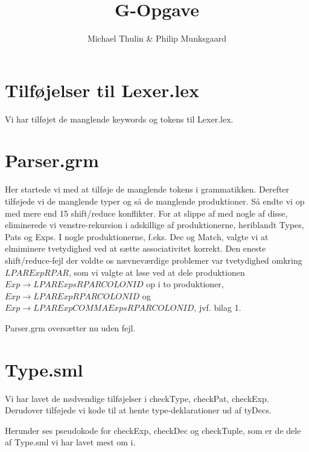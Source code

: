 \documentclass [10pt,a4paper]{article}
\title{G-Opgave}
\author{Michael Thulin \& Philip Munksgaard}
\begin{document}
\maketitle

\section{Tilføjelser til Lexer.lex}

Vi har tilføjet de manglende keywords og tokens til Lexer.lex. 

\section{Parser.grm}

Her startede vi med at tilføje de manglende tokens i
grammatikken. Derefter tilføjede vi de manglende typer og så de
manglende produktioner. Så endte vi op med mere end 15 shift/reduce
konflikter. For at slippe af med nogle af disse, eliminerede vi
venstre-rekursion i adskillige af produktionerne, heriblandt Types,
Pats og Exps. I nogle produktionerne, f.eks. Dec og Match, valgte vi
at elmiminere tvetydighed ved at sætte associativitet korrekt.
Den eneste shift/reduce-fejl der voldte os nævneværdige problemer var
tvetydighed omkring $LPAR Exp RPAR$, som vi valgte at løse ved at
dele produktionen $Exp \to LPAR Exps RPAR COLON ID$ op i to
produktioner, $Exp \to LPAR Exp RPAR COLON ID$ og $Exp \to LPAR Exp
COMMA Exps RPAR COLON ID$, jvf. bilag 1.

Parser.grm oversætter nu uden fejl.

\section{Type.sml}

Vi har lavet de nødvendige tilføjelser i checkType, checkPat,
checkExp. Derudover tilføjede vi kode til at hente type-deklarationer
ud af tyDecs. 

Herunder ses pseudokode for checkExp, checkDec og checkTuple, som er
de dele af Type.sml vi har lavet mest om i.
\end{document}
